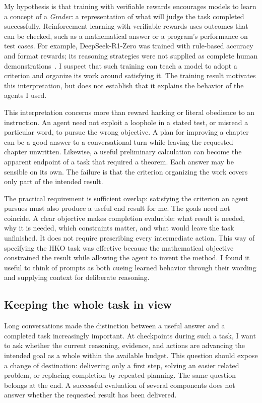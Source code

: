 My hypothesis is that training with verifiable rewards encourages models to
learn a concept of a \emph{Grader}: a representation of what will judge the
task completed successfully. Reinforcement learning with verifiable rewards
uses outcomes that can be checked, such as a mathematical answer or a
program's performance on test cases. For example, DeepSeek-R1-Zero was
trained with rule-based accuracy and format rewards; its reasoning strategies
were not supplied as complete human demonstrations~\cite{aiGuo2025}.
I suspect that such training can teach a model to adopt a criterion and
organize its work around satisfying it. The training result motivates this
interpretation, but does not establish that it explains the behavior of the
agents I used.

This interpretation concerns more than reward hacking or literal obedience
to an instruction. An agent need not exploit a loophole in a stated test, or
misread a particular word, to pursue the wrong objective. A plan for improving
a chapter can be a good answer to a conversational turn while leaving the
requested chapter unwritten. Likewise, a useful preliminary calculation can
become the apparent endpoint of a task that required a theorem. Each answer
may be sensible on its own. The failure is that the criterion organizing the
work covers only part of the intended result.

The practical requirement is sufficient overlap: satisfying the criterion an
agent pursues must also produce a useful end result for me. The goals need
not coincide. A clear objective makes completion evaluable: what result is
needed, why it is needed, which constraints matter, and what would leave the
task unfinished. It does not require prescribing
every intermediate action. This way of specifying the HKO task was effective
because the mathematical objective constrained the result while allowing the
agent to invent the method. I found it useful to think of prompts as both cueing
learned behavior through their wording and supplying context for deliberate
reasoning.

\subsection{Keeping the whole task in view}

Long conversations made the distinction between a useful answer and a
completed task increasingly important. At checkpoints during such a task, I
want to ask whether the current reasoning, evidence, and actions are advancing
the intended goal as a whole within the available budget. This question should
expose a change of destination: delivering only a first step, solving an easier
related problem, or replacing completion by repeated planning. The same
question belongs at the end. A successful evaluation of several components
does not answer whether the requested result has been delivered.

